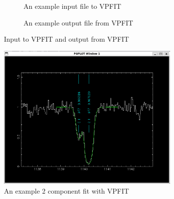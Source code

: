 \begin{figure}[!htbp]
    \centering
     \begin{subfigure}[t]{\textwidth}
         \centering
         {
            \setlength{\fboxsep}{0pt}
            \setlength{\fboxrule}{1pt}
}
         \caption{An example input file to VPFIT}
         \label{fig:VPFIT-ip}
     \end{subfigure}

\medskip
\medskip
\medskip

    \begin{subfigure}[t]{\textwidth}
         \centering
         {
            \setlength{\fboxsep}{0pt}
            \setlength{\fboxrule}{1pt}
}
         \caption{An example output file from VPFIT}
         \label{fig:VPFIT-op}
     \end{subfigure}
    \caption{Input to VPFIT and output from VPFIT}
    \label{fig:ip-op}
\end{figure}

\begin{figure}[!t]
    \vspace{-75mm}
     \centering
     \includegraphics[width=0.8\textwidth]{Figures/VPFIT_fit.png}
     \caption{An example 2 component fit with VPFIT}
     \label{fig:VPFIT-fit} 
\end{figure}